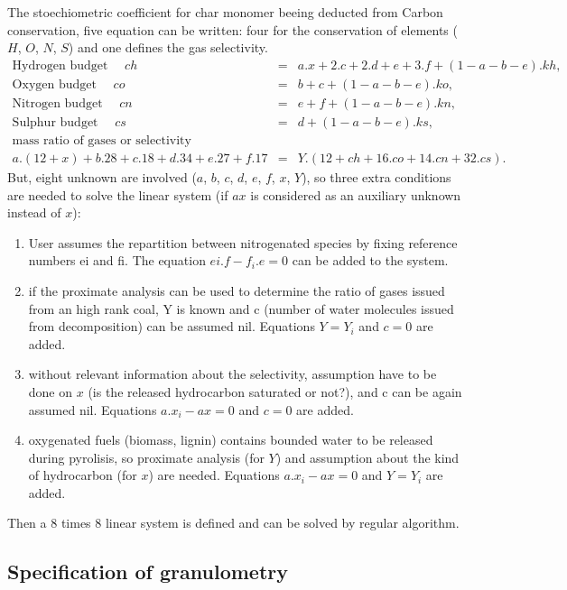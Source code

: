 The stoechiometric coefficient for char monomer beeing deducted from Carbon
conservation, five equation can be written: four for the conservation of
elements ($H$, $O$, $N$, $S$) and one defines the gas selectivity.
\begin{eqnarray*}
  \text{Hydrogen budget  } \quad ch &=& a.x + 2.c + 2.d + e + 3.f +(1-a-b-e).kh, \\
  \text{Oxygen budget    } \quad co &=& b + c + (1-a-b-e) . ko, \\
  \text{Nitrogen budget  } \quad cn &=& e + f + (1-a-b-e).kn, \\
  \text{Sulphur budget   } \quad cs &=& d + (1-a-b-e) .ks, \\
  \text{mass ratio of gases or selectivity} \\
  a.(12+x) + b.28 +c.18+d.34+e.27+f.17 &=& Y .(12+ch+16.co+14.cn+32.cs).
\end{eqnarray*}
But, eight unknown are involved ($a$, $b$, $c$, $d$, $e$, $f$, $x$, $Y$), so three extra
conditions are needed to solve the linear system (if $ax$ is considered as an
auxiliary unknown instead of $x$):
\begin{enumerate}

\item User assumes the repartition between nitrogenated species by fixing
  reference numbers ei and fi. The equation $ei.f-f_i.e=0$ can be added to the
  system.
\item if the proximate analysis can be used to determine the ratio of gases
  issued from an high rank coal, Y is known and c (number of water
  molecules issued from decomposition) can be assumed nil. Equations $Y=Y_i$ and
  $c=0$ are added.
\item without relevant information about the selectivity, assumption have to be
  done on $x$ (is the released hydrocarbon saturated or not?), and c can be again
  assumed nil. Equations $a.x_i-ax = 0$ and $c=0$ are added.
\item oxygenated fuels (biomass, lignin) contains bounded water to be released
  during pyrolisis, so proximate analysis (for $Y$) and assumption about the kind
  of hydrocarbon (for $x$) are needed. Equations $a.x_i-ax = 0$ and $Y=Y_i$ are
  added.

\end{enumerate}
Then a 8 times 8 linear system is defined and can be solved by regular algorithm.

\subsection{Specification of granulometry}

